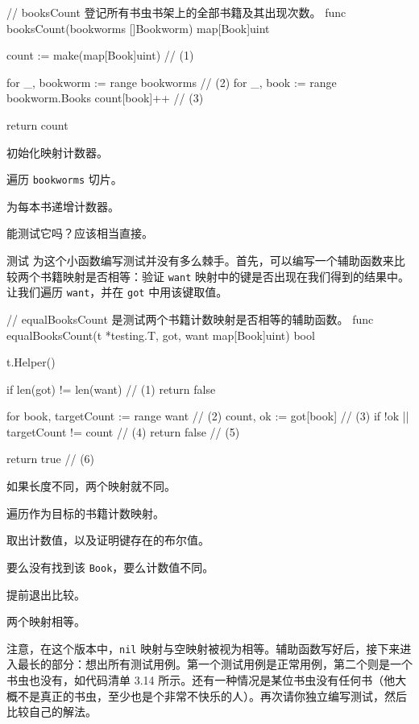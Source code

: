 \begin{gocode}[title={代码清单 3.12 \texttt{bookworm.go}：\texttt{booksCount()} 函数}]
// booksCount 登记所有书虫书架上的全部书籍及其出现次数。
func booksCount(bookworms []Bookworm) map[Book]uint {
    count := make(map[Book]uint) // (1)

    for _, bookworm := range bookworms { // (2)
        for _, book := range bookworm.Books {
            count[book]++ // (3)
        }
    }

    return count
}
\end{gocode}

\begin{codeannotations}
  \item 初始化映射计数器。
  \item 遍历 \texttt{bookworms} 切片。
  \item 为每本书递增计数器。
\end{codeannotations}

能测试它吗？应该相当直接。

\begin{infobox}{测试}
为这个小函数编写测试并没有多么棘手。首先，可以编写一个辅助函数来比较两个书籍映射是否相等：验证 \texttt{want} 映射中的键是否出现在我们得到的结果中。让我们遍历 \texttt{want}，并在 \texttt{got} 中用该键取值。

\begin{gocode}[title={代码清单 3.13 \texttt{bookworms\_internal\_test.go}：比较书籍计数}]
// equalBooksCount 是测试两个书籍计数映射是否相等的辅助函数。
func equalBooksCount(t *testing.T, got, want map[Book]uint) bool {
    t.Helper()

    if len(got) != len(want) { // (1)
        return false
    }

    for book, targetCount := range want { // (2)
        count, ok := got[book]              // (3)
        if !ok || targetCount != count {    // (4)
            return false                    // (5)
        }
    }

    return true // (6)
}
\end{gocode}

\begin{codeannotations}
  \item 如果长度不同，两个映射就不同。
  \item 遍历作为目标的书籍计数映射。
  \item 取出计数值，以及证明键存在的布尔值。
  \item 要么没有找到该 \texttt{Book}，要么计数值不同。
  \item 提前退出比较。
  \item 两个映射相等。
\end{codeannotations}

注意，在这个版本中，\texttt{nil} 映射与空映射被视为相等。辅助函数写好后，接下来进入最长的部分：想出所有测试用例。第一个测试用例是正常用例，第二个则是一个书虫也没有，如代码清单 3.14 所示。还有一种情况是某位书虫没有任何书（他大概不是真正的书虫，至少也是个非常不快乐的人）。再次请你独立编写测试，然后比较自己的解法。
\end{infobox}


